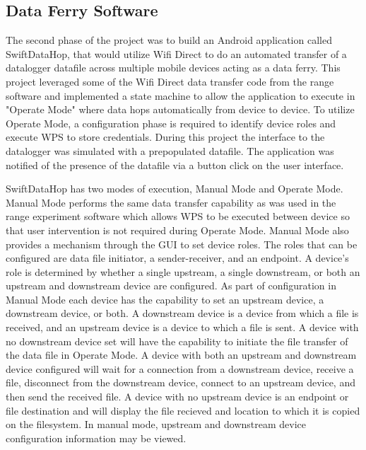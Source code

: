 \documentclass[10pt,twocolumn]{article}
\begin{document}
\subsection{Data Ferry Software}
The second phase of the project was to build an Android application called SwiftDataHop, that would utilize Wifi Direct to do an automated transfer of a datalogger datafile across multiple mobile devices acting as a data ferry. 
This project leveraged some of the Wifi Direct data transfer code from the range software and implemented a state machine to allow the application to execute in "Operate Mode" where data hops automatically from device to device. 
To utilize Operate Mode, a configuration phase is required to identify device roles and execute WPS to store credentials.
During this project the interface to the datalogger was simulated with a prepopulated datafile.
The application was notified of the presence of the datafile via a button click on the user interface.

SwiftDataHop has two modes of execution, Manual Mode and Operate Mode.
Manual Mode performs the same data transfer capability as was used in the range experiment software which allows WPS to be executed between device so that user intervention is not required during Operate Mode.
Manual Mode also provides a mechanism through the GUI to set device roles.
The roles that can be configured are data file initiator, a sender-receiver, and an endpoint.
A device's role is determined by whether a single upstream, a single downstream, or both an upstream and downstream device are configured.
As part of configuration in Manual Mode each device has the capability to set an upstream device, a downstream device, or both.  
A downstream device is a device from which a file is received, and an upstream device is a device to which a file is sent.
A device with no downstream device set will have the capability to initiate the file transfer of the data file in Operate Mode.
A device with both an upstream and downstream device configured will wait for a connection from a downstream device, receive a file, disconnect from the downstream device, connect to an upstream device, and then send the received file.
A device with no upstream device is an endpoint or file destination and will display the file recieved and location to which it is copied on the filesystem.
In manual mode, upstream and downstream device configuration information may be viewed.
\end{document}
